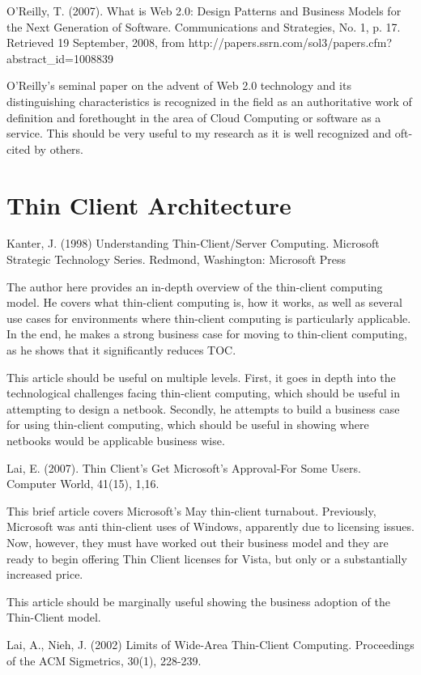 \documentclass[12pt,oneside,letterpaper,titlepage]{article}
\begin{document}
O'Reilly, T. (2007). What is Web 2.0: Design Patterns and Business Models for the Next Generation of Software. Communications and Strategies, No. 1, p. 17. Retrieved 19 September, 2008, from http://papers.ssrn.com/sol3/papers.cfm?abstract_id=1008839

O'Reilly's seminal paper on the advent of Web 2.0 technology and its
distinguishing characteristics is recognized in the field as an authoritative
work of definition and forethought in the area of Cloud Computing or software as
a service.  This should be very useful to my research as it is well recognized
and oft-cited by others.

\section{Thin Client Architecture}

Kanter, J. (1998) Understanding Thin-Client/Server Computing. Microsoft Strategic Technology Series. Redmond, Washington: Microsoft Press

The author here provides an in-depth overview of the thin-client computing
model.  He covers what thin-client computing is, how it works, as well as
several use cases for environments where thin-client computing is particularly
applicable.  In the end, he makes a strong business case for moving to
thin-client computing, as he shows that it significantly reduces TOC.

This article should be useful on multiple levels.  First, it goes in depth into
the technological challenges facing thin-client computing, which should be
useful in attempting to design a netbook.  Secondly, he attempts to build a
business case for using thin-client computing, which should be useful in showing
where netbooks would be applicable business wise.

Lai, E. (2007). Thin Client's Get Microsoft's Approval-For Some Users. Computer World, 41(15), 1,16.

This brief article covers Microsoft's May thin-client turnabout.  Previously,
Microsoft was anti thin-client uses of Windows, apparently due to licensing
issues.  Now, however, they must have worked out their business model and they
are ready to begin offering Thin Client licenses for Vista, but only or a
substantially increased price.

This article should be marginally useful showing the business adoption of the
Thin-Client model.

Lai, A., Nieh, J. (2002) Limits of Wide-Area Thin-Client Computing. Proceedings of the ACM Sigmetrics, 30(1), 228-239.
\end{document}
